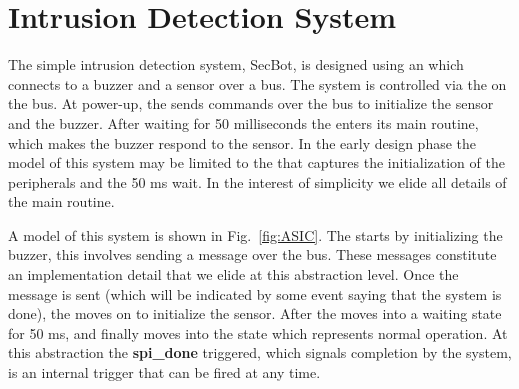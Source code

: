 

\section{Intrusion Detection System}
\label{sec:secbot}

The simple intrusion detection system, SecBot, is designed using an \ASIC which connects to a buzzer and a sensor over a \SPI bus. The system is controlled via the \ASIC on the \SPI bus. At power-up, the \ASIC sends commands over the \SPI bus to initialize the sensor and the buzzer. After waiting for 50 milliseconds the \ASIC enters its main routine, which makes the buzzer respond to the sensor. In the early design phase the \statechart model of this system may be limited to the \ASIC that captures the initialization of the peripherals and the 50 ms wait. In the interest of simplicity we elide all details of the main routine.

A \statechart model of this system is shown in Fig.~\ref{fig:ASIC}. The \ASIC starts by initializing the buzzer, this involves sending a message over the \SPI bus. These messages constitute an implementation detail that we elide at this abstraction level. Once the message is sent (which will be indicated by some event saying that the \SPI system is done), the \ASIC moves on to initialize the sensor. After the \ASIC moves into a waiting state for 50 ms, and finally moves into the state which represents normal operation. At this abstraction the \textbf{spi\_done} triggered, which signals completion by the \SPI system, is an internal trigger that can be fired at any time.

